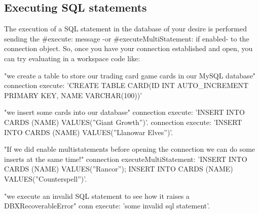 \documentclass[a4paper,10pt,twoside]{book}
\begin{document}
\subsection{Executing SQL statements}

The execution of a SQL statement in the database of your desire is performed sending the \#execute: message -or \#executeMultiStatement: if enabled- to the connection object.  So, once you have your connection established and open, you can try evaluating in a workspace code like:

\begin{code}{}
"we create a table to store our trading card game cards in our MySQL database"
connection execute: 'CREATE TABLE CARD(ID INT AUTO_INCREMENT PRIMARY KEY, NAME VARCHAR(100))'

"we insert some cards into our database"
connection execute: 'INSERT INTO CARDS (NAME) VALUES(''Giant Growth'')'.
connection execute: 'INSERT INTO CARDS (NAME) VALUES(''Llanowar Elves'')'.

"If we did enable multistatements before opening the connection we can do some inserts at the same time!"
connection executeMultiStatement: 'INSERT INTO CARDS (NAME) VALUES(''Rancor'');
						            INSERT INTO CARDS (NAME) VALUES(''Counterspell'')'.

"we execute an invalid SQL statement to see how it raises a DBXRecoverableError"
conn execute: 'some invalid sql statement'.
\end{code}



\ifx\wholebook\relax\else
   
   
\end{document}

